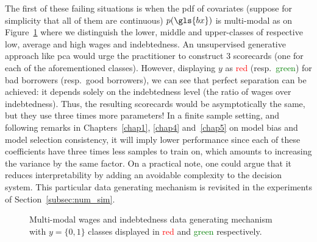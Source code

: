 The first of these failing situations is when the \gls{pdf} of covariates (suppose for simplicity that all of them are continuous) $p(\gls{bx})$ is multi-modal as on Figure~\ref{fig:xdiff} where we distinguish the lower, middle and upper-classes of respective low, average and high wages and indebtedness. An unsupervised generative approach like \gls{pca} would urge the practitioner to construct 3 scorecards (one for each of the aforementioned classes). However, displaying $y$ as \textcolor{red}{red} (resp.\ \textcolor{green}{green}) for bad borrowers (resp.\ good borrowers), we can see that perfect separation can be achieved: it depends solely on the indebtedness level (the ratio of wages over indebtedness). Thus, the resulting scorecards would be asymptotically the same, but they use three times more parameters! In a finite sample setting, and following remarks in Chapters~\ref{chap1}, \ref{chap4} and~\ref{chap5} on model bias and model selection consistency, it will imply lower performance since each of these coefficients have three times less samples to train on, which amounts to increasing the variance by the same factor. On a practical note, one could argue that it reduces interpretability by adding an avoidable complexity to the decision system. This particular data generating mechanism is revisited in the experiments of Section~\ref{subsec:num_sim}.


\begin{figure}
\centering
{}
\caption{\label{fig:xdiff} Multi-modal wages and indebtedness data generating mechanism with $y = \{0,1\}$ classes displayed in \textcolor{red}{red} and \textcolor{green}{green} respectively.}
\end{figure}

